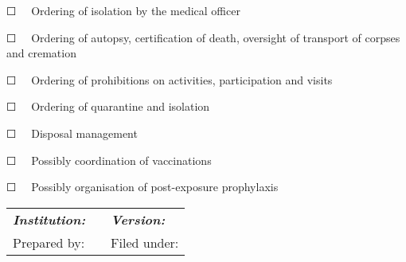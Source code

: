 \documentclass{article}
\begin{document}
☐   Ordering of isolation by the medical officer


☐   Ordering of autopsy, certification of death, oversight of transport of corpses and cremation


☐   Ordering of prohibitions on activities, participation and visits


☐   Ordering of quarantine and isolation


☐   Disposal management


☐   Possibly coordination of vaccinations


☐   Possibly organisation of post-exposure prophylaxis


\begin{tabu} to \textwidth { |X|X|X| }
\hline



\emph{\textbf{Institution:}} &  & \emph{\textbf{Version:}}
 \\


Prepared by: &  &  Filed under:
 \\
\hline

\end{tabu}

 


 


 
\end{document}
